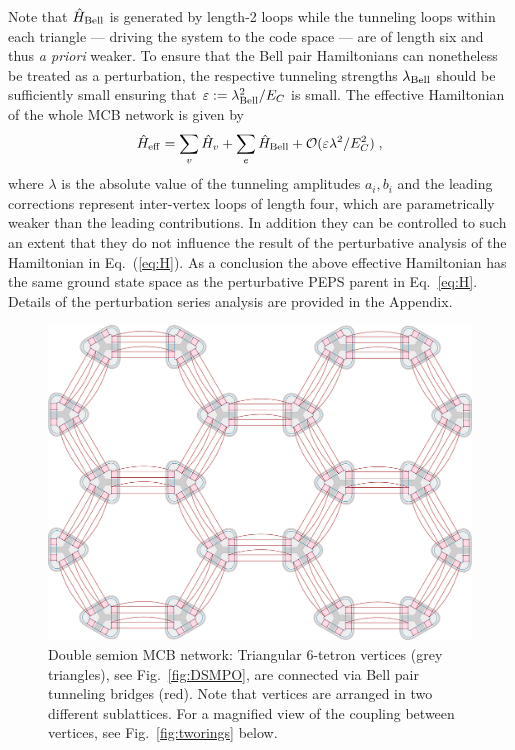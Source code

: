 \documentclass[twocolumn,floats,prx,showpacs]{revtex4-1}
\begin{document}
Note that $\hat H_{\rm Bell}$ is generated by length-2 loops while the  tunneling loops within each triangle --- driving the system to the code space --- 
are of length six and thus \emph{a priori} weaker. 
To ensure that the Bell pair Hamiltonians can nonetheless be treated as a perturbation, the respective tunneling strengths $\lambda_{\rm Bell}$ should be sufficiently small ensuring that $\varepsilon:=\lambda^2_{\rm Bell}/E_C$ is small. The effective Hamiltonian of the whole MCB network is given by
\begin{equation}
\hat H_{\rm eff}= \sum_v \hat H_v + \sum_e \hat H_{\rm Bell} + \mathcal O(\varepsilon\lambda^2/E_C^2) \;, \label{eq:DSeff}
\end{equation} 
where $\lambda$ is the absolute value of the tunneling amplitudes $a_i,b_i$ and the leading corrections represent inter-vertex loops of length four, which are parametrically weaker than the leading contributions. In addition they can be controlled to such an extent that they do not influence the result of the perturbative analysis \cite{Brell2014} of the Hamiltonian in Eq.~(\ref{eq:H}). As a conclusion the above effective Hamiltonian has the same ground state space as the perturbative PEPS parent in Eq.~\eqref{eq:H}. Details of the perturbation series analysis are provided in the Appendix.

\begin{figure}
\includegraphics[width=\columnwidth]{fig/tiling.pdf}
\caption{Double semion MCB network: Triangular 6-tetron vertices (grey triangles), see Fig.~\ref{fig:DSMPO}, are connected via Bell pair tunneling bridges (red). Note that vertices are arranged in two different sublattices. For a magnified view of the coupling between vertices, see Fig.~\ref{fig:tworings} below.}
\label{fig:DS}
\end{figure}
\end{document}
